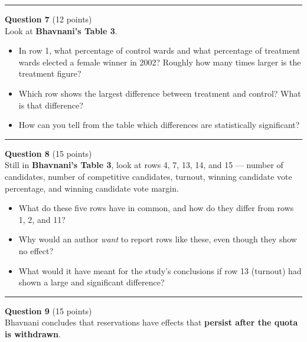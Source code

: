 \documentclass[
]{article}
\providecommand{\tightlist}{%
  \setlength{\itemsep}{0pt}\setlength{\parskip}{0pt}}
\begin{document}
\vspace{3cm}

\begin{center}\rule{0.5\linewidth}{0.5pt}\end{center}

\textbf{Question 7} (12 points)\\
Look at \textbf{Bhavnani's Table 3}.

\begin{itemize}
\tightlist
\item
  In row 1, what percentage of control wards and what percentage of
  treatment wards elected a female winner in 2002? Roughly how many
  times larger is the treatment figure?
\item
  Which row shows the largest difference between treatment and control?
  What is that difference?
\item
  How can you tell from the table which differences are statistically
  significant?
\end{itemize}

\vspace{4cm}

\begin{center}\rule{0.5\linewidth}{0.5pt}\end{center}

\textbf{Question 8} (15 points)\\
Still in \textbf{Bhavnani's Table 3}, look at rows 4, 7, 13, 14, and 15
--- number of candidates, number of competitive candidates, turnout,
winning candidate vote percentage, and winning candidate vote margin.

\begin{itemize}
\tightlist
\item
  What do these five rows have in common, and how do they differ from
  rows 1, 2, and 11?
\item
  Why would an author \emph{want} to report rows like these, even though
  they show no effect?
\item
  What would it have meant for the study's conclusions if row 13
  (turnout) had shown a large and significant difference?
\end{itemize}

\vspace{5cm}

\begin{center}\rule{0.5\linewidth}{0.5pt}\end{center}

\textbf{Question 9} (15 points)\\
Bhavnani concludes that reservations have effects that \textbf{persist
after the quota is withdrawn}.
\end{document}
